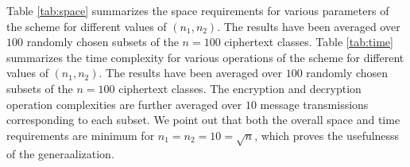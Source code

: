 \begin{table}[!t]
\centering
\captionsetup{font=scriptsize}
\caption{Time Complexities}
\label{tab:time}
\end{table}

Table \ref{tab:space} summarizes the space requirements for various parameters of the scheme for different values of $(n_1,n_2)$. The results have been averaged over $100$ randomly chosen subsets of the $n=100$ ciphertext classes. Table \ref{tab:time} summarizes the time complexity for various operations of the scheme for different values of $(n_1,n_2)$. The results have been averaged over $100$ randomly chosen subsets of the $n=100$ ciphertext classes. The encryption and decryption operation complexities are further averaged over $10$ message transmissions corresponding to each subset. We point out that both the overall space and time requirements are minimum for $n_1=n_2=10=\surd n$, which proves the usefulnesss of the generaalization.

